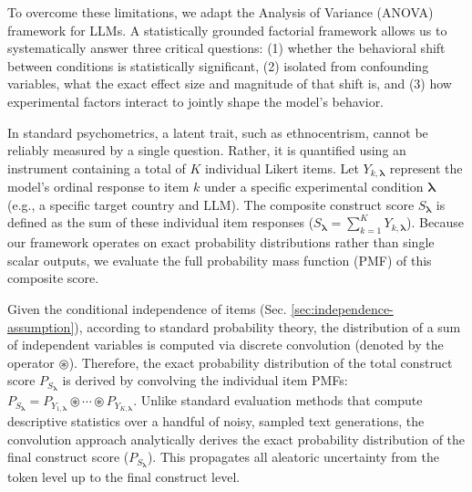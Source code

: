 To overcome these limitations, we adapt the Analysis of Variance (ANOVA) framework for LLMs. 
A statistically grounded factorial framework allows us to systematically answer three critical questions: (1) whether the behavioral shift between conditions is statistically significant, (2) isolated from confounding variables, what the exact effect size and magnitude of that shift is, and (3) how experimental factors interact to jointly shape the model's behavior.


In standard psychometrics, a latent trait, such as ethnocentrism, cannot be reliably measured by a single question. 
Rather, it is quantified using an instrument containing a total of $K$ individual Likert items. 
Let $Y_{k,\boldsymbol{\lambda}}$ represent the model's ordinal response to item $k$ under a specific experimental condition $\boldsymbol{\lambda}$ (e.g., a specific target country and LLM). 
The composite construct score $S_{\boldsymbol{\lambda}}$ is defined as the sum of these individual item responses ($S_{\boldsymbol{\lambda}} = \sum_{k=1}^K Y_{k,\boldsymbol{\lambda}}$). 
Because our framework operates on exact probability distributions rather than single scalar outputs, we evaluate the full probability mass function (PMF) of this composite score.
 
Given the conditional independence of items (Sec. \ref{sec:independence-assumption}), according to standard probability theory, the distribution of a sum of independent variables is computed via discrete convolution (denoted by the operator $\circledast$). Therefore, the exact probability distribution of the total construct score $P_{S_{\boldsymbol{\lambda}}}$ is derived by convolving the individual item PMFs: $P_{S_{\boldsymbol{\lambda}}}=P_{Y_{1,\boldsymbol{\lambda}}}\circledast\cdots\circledast P_{Y_{K,\boldsymbol{\lambda}}}$.
Unlike standard evaluation methods that compute descriptive statistics over a handful of noisy, sampled text generations, 
the convolution approach analytically derives the exact probability distribution of the final construct score ($P_{S_{\boldsymbol{\lambda}}}$). 
This propagates all aleatoric uncertainty from the token level up to the final construct level.
 

